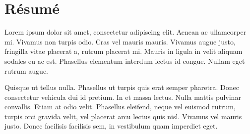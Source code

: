 \chapter{Résumé}

Lorem ipsum dolor sit amet, consectetur adipiscing elit. Aenean ac
ullamcorper mi. Vivamus non turpis odio. Cras vel mauris mauris. Vivamus
augue justo, fringilla vitae placerat a, rutrum placerat mi. Mauris in
ligula in velit aliquam sodales eu ac est. Phasellus elementum interdum
lectus id congue. Nullam eget rutrum augue.

Quisque ut tellus nulla. Phasellus ut turpis quis erat semper pharetra.
Donec consectetur vehicula dui id pretium. In et massa lectus. Nulla mattis
pulvinar convallis. Etiam at odio velit. Phasellus eleifend, neque vel
euismod rutrum, turpis orci gravida velit, vel placerat arcu lectus quis
nisl. Vivamus vel mauris justo. Donec facilisis facilisis sem, in vestibulum
quam imperdiet eget.

